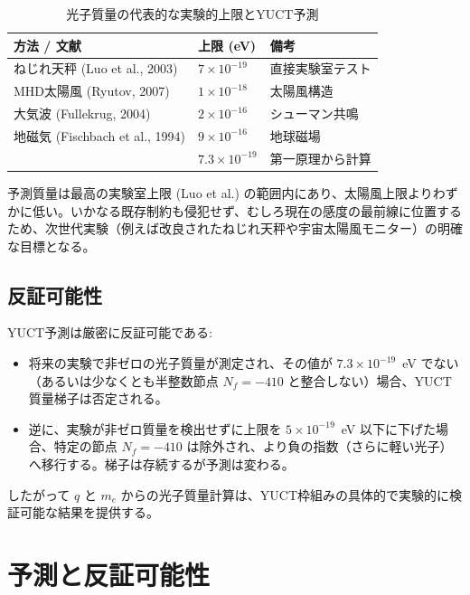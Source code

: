 \documentclass[11pt,a4paper]{article}
\begin{document}
	\begin{table}[H]
		\centering
		\footnotesize
		\caption{光子質量の代表的な実験的上限とYUCT予測}
		\label{tab:photon_limits}
		\begin{tabular}{p{5.2cm}p{2.2cm}p{3.6cm}}
			\toprule
			\textbf{方法 / 文献} & \textbf{上限 (eV)} & \textbf{備考} \\
			\midrule
			ねじれ天秤 (Luo et al., 2003) & \(7\times10^{-19}\) & 直接実験室テスト \\
			MHD太陽風 (Ryutov, 2007) & \(1\times10^{-18}\) & 太陽風構造 \\
			大気波 (Fullekrug, 2004) & \(2\times10^{-16}\) & シューマン共鳴 \\
			地磁気 (Fischbach et al., 1994) & \(9\times10^{-16}\) & 地球磁場 \\
			\addlinespace
			\multicolumn{1}{c}{\textbf{YUCT予測}} & \multicolumn{1}{c}{\(7.3\times10^{-19}\)} & 第一原理から計算 \\
			\bottomrule
		\end{tabular}
	\end{table}
	
	予測質量は最高の実験室上限 (Luo et al.) の範囲内にあり、太陽風上限よりわずかに低い。いかなる既存制約も侵犯せず、むしろ現在の感度の最前線に位置するため、次世代実験（例えば改良されたねじれ天秤や宇宙太陽風モニター）の明確な目標となる。
	
	\subsection{反証可能性}
	
	YUCT予測は厳密に反証可能である:
	\begin{itemize}
		\item 将来の実験で非ゼロの光子質量が測定され、その値が \(7.3\times10^{-19}\)~eV でない（あるいは少なくとも半整数節点 \(N_f = -410\) と整合しない）場合、YUCT質量梯子は否定される。
		\item 逆に、実験が非ゼロ質量を検出せずに上限を \(5\times10^{-19}\)~eV 以下に下げた場合、特定の節点 \(N_f = -410\) は除外され、より負の指数（さらに軽い光子）へ移行する。梯子は存続するが予測は変わる。
	\end{itemize}
	したがって $q$ と $m_e$ からの光子質量計算は、YUCT枠組みの具体的で実験的に検証可能な結果を提供する。
	
	\clearpage
	\section{予測と反証可能性}
	
\end{document}

